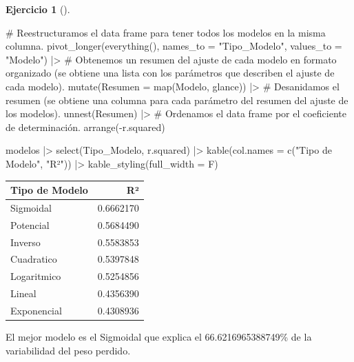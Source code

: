 \documentclass[
  a4paper,
]{scrreport}
\newenvironment{Shaded}{\begin{snugshade}}{\end{snugshade}}
\newcommand{\AttributeTok}[1]{\textcolor[rgb]{0.40,0.45,0.13}{#1}}
\newcommand{\CommentTok}[1]{\textcolor[rgb]{0.37,0.37,0.37}{#1}}
\newcommand{\FunctionTok}[1]{\textcolor[rgb]{0.28,0.35,0.67}{#1}}
\newcommand{\NormalTok}[1]{\textcolor[rgb]{0.00,0.23,0.31}{#1}}
\newcommand{\SpecialCharTok}[1]{\textcolor[rgb]{0.37,0.37,0.37}{#1}}
\newcommand{\StringTok}[1]{\textcolor[rgb]{0.13,0.47,0.30}{#1}}
\theoremstyle{definition}
\newtheorem{exercise}{Ejercicio}[chapter]
\theoremstyle{remark}
\begin{document}
\begin{exercise}[]
\begin{enumerate}
\begin{tcolorbox}
\begin{Shaded}
\begin{Highlighting}[]
    \CommentTok{\# Reestructuramos el data frame para tener todos los modelos en la misma columna.}
    \FunctionTok{pivot\_longer}\NormalTok{(}\FunctionTok{everything}\NormalTok{(), }\AttributeTok{names\_to =} \StringTok{"Tipo\_Modelo"}\NormalTok{, }\AttributeTok{values\_to =} \StringTok{"Modelo"}\NormalTok{)  }\SpecialCharTok{|\textgreater{}} 
    \CommentTok{\# Obtenemos un resumen del ajuste de cada modelo en formato organizado (se obtiene una lista con los parámetros que describen el ajuste de cada modelo).}
    \FunctionTok{mutate}\NormalTok{(}\AttributeTok{Resumen =} \FunctionTok{map}\NormalTok{(Modelo, glance)) }\SpecialCharTok{|\textgreater{}} 
    \CommentTok{\# Desanidamos el resumen (se obtiene una columna para cada parámetro del resumen del ajuste de los modelos).}
    \FunctionTok{unnest}\NormalTok{(Resumen)  }\SpecialCharTok{|\textgreater{}} 
    \CommentTok{\# Ordenamos el data frame por el coeficiente de determinación.}
    \FunctionTok{arrange}\NormalTok{(}\SpecialCharTok{{-}}\NormalTok{r.squared)}

\NormalTok{modelos  }\SpecialCharTok{|\textgreater{}}
    \FunctionTok{select}\NormalTok{(Tipo\_Modelo, r.squared)  }\SpecialCharTok{|\textgreater{}} 
    \FunctionTok{kable}\NormalTok{(}\AttributeTok{col.names =} \FunctionTok{c}\NormalTok{(}\StringTok{"Tipo de Modelo"}\NormalTok{, }\StringTok{"R²"}\NormalTok{)) }\SpecialCharTok{|\textgreater{}}
    \FunctionTok{kable\_styling}\NormalTok{(}\AttributeTok{full\_width =}\NormalTok{ F)}
\end{Highlighting}
\end{Shaded}

  \begin{table}
  \centering
  \begin{tabular}{l|r}
  \hline
  Tipo de Modelo & R²\\
  \hline
  Sigmoidal & 0.6662170\\
  \hline
  Potencial & 0.5684490\\
  \hline
  Inverso & 0.5583853\\
  \hline
  Cuadratico & 0.5397848\\
  \hline
  Logaritmico & 0.5254856\\
  \hline
  Lineal & 0.4356390\\
  \hline
  Exponencial & 0.4308936\\
  \hline
  \end{tabular}
  \end{table}

  El mejor modelo es el Sigmoidal que explica el 66.6216965388749\% de
  la variabilidad del peso perdido.


\end{tcolorbox}
\end{enumerate}
\end{exercise}
\end{document}
